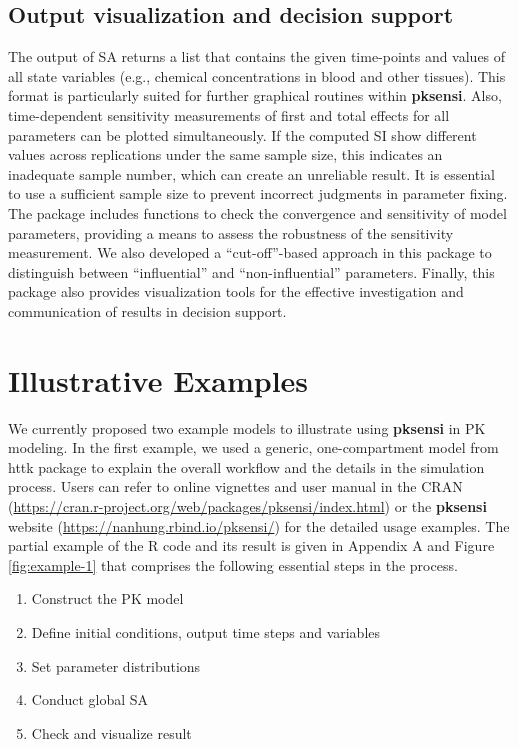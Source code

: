 \documentclass[preprint,12pt, a4paper]{elsarticle}
\begin{document}
\subsection{Output visualization and decision
support}

The output of SA returns a list that contains the given time-points and
values of all state variables (e.g., chemical concentrations in blood and other tissues).
This format is particularly suited for further graphical routines within
\textbf{pksensi}. Also, time-dependent sensitivity measurements of
first and total effects for all parameters can be plotted
simultaneously. If the computed SI show different values across
replications under the same sample size, this indicates an inadequate
sample number, which can create an unreliable result. It is essential to
use a sufficient sample size to prevent incorrect judgments in parameter
fixing. The package includes functions to check the convergence
and sensitivity of model parameters, providing a means to assess the
robustness of the sensitivity measurement. We also developed a
``cut-off''-based approach in this package to distinguish between
``influential'' and ``non-influential'' parameters. Finally,
this package also provides visualization tools for the effective
investigation and communication of results in decision support.

\section{Illustrative Examples}

We currently proposed two example models to illustrate using \textbf{pksensi} in PK modeling. 
In the first example, we used a generic, one-compartment model from
httk package \cite{JSSv079i04} to explain the overall workflow and the details in the simulation process.
Users can refer to online vignettes and user manual in 
the CRAN (\url{https://cran.r-project.org/web/packages/pksensi/index.html}) or the
\textbf{pksensi} website (\url{https://nanhung.rbind.io/pksensi/}) for the detailed usage examples. 
The partial example of the R code and its result is given in Appendix A and Figure \ref{fig:example-1} that comprises the following essential steps in the process.

\begin{enumerate}
  \item Construct the PK model
  \item Define initial conditions, output time steps and variables
  \item Set parameter distributions
  \item Conduct global SA
  \item Check and visualize result
\end{enumerate}
\end{document}
